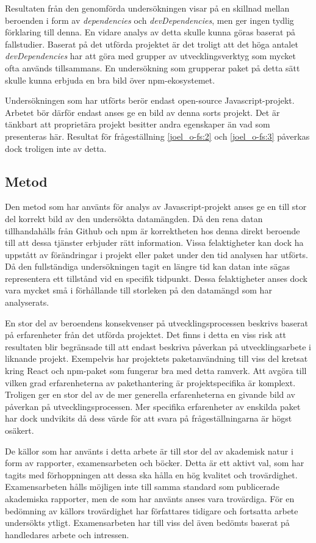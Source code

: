Resultaten från den genomförda undersökningen visar på en skillnad mellan beroenden i form av \textit{dependencies} och \textit{devDependencies}, men ger ingen tydlig förklaring till denna. En vidare analys av detta skulle kunna göras baserat på fallstudier. Baserat på det utförda projektet är det troligt att det höga antalet \textit{devDependencies} har att göra med grupper av utvecklingsverktyg som mycket ofta används tillsammans. En undersökning som grupperar paket på detta sätt skulle kunna erbjuda en bra bild över npm-ekosystemet.

Undersökningen som har utförts berör endast open-source Javascript-projekt. Arbetet bör därför endast anses ge en bild av denna sorts projekt. Det är tänkbart att proprietära projekt besitter andra egenskaper än vad som presenteras här. Resultat för frågeställning \ref{joel_o-fs:2} och \ref{joel_o-fs:3} påverkas dock troligen inte av detta.

\subsection{Metod}
\label{subsec:joel_o-discussion-method}
Den metod som har använts för analys av Javascript-projekt anses ge en till stor del korrekt bild av den undersökta datamängden. Då den rena datan tillhandahålls från Github och npm är korrektheten hos denna direkt beroende till att dessa tjänster erbjuder rätt information. Vissa felaktigheter kan dock ha uppstått av förändringar i projekt eller paket under den tid analysen har utförts. Då den fullständiga undersökningen tagit en längre tid kan datan inte sägas representera ett tillstånd vid en specifik tidpunkt. Dessa felaktigheter anses dock vara mycket små i förhållande till storleken på den datamängd som har analyserats.

En stor del av beroendens konsekvenser på utvecklingsprocessen beskrivs baserat på erfarenheter från det utförda projektet. Det finns i detta en viss risk att resultaten blir begränsade till att endast beskriva påverkan på utvecklingsarbete i liknande projekt. Exempelvis har projektets paketanvändning till viss del kretsat kring React och npm-paket som fungerar bra med detta ramverk. Att avgöra till vilken grad erfarenheterna av pakethantering är projektspecifika är komplext. Troligen ger en stor del av de mer generella erfarenheterna en givande bild av påverkan på utvecklingsprocessen. Mer specifika erfarenheter av enskilda paket har dock undvikits då dess värde för att svara på frågeställningarna är högst osäkert.

De källor som har använts i detta arbete är till stor del av akademisk natur i form av rapporter, examensarbeten och böcker. Detta är ett aktivt val, som har tagits med förhoppningen att dessa ska hålla en hög kvalitet och trovärdighet. Examensarbeten hålls möjligen inte till samma standard som publicerade akademiska rapporter, men de som har använts anses vara trovärdiga. För en bedömning av källors trovärdighet har författares tidigare och fortsatta arbete undersökts ytligt. Examensarbeten har till viss del även bedömts baserat på handledares arbete och intressen.

